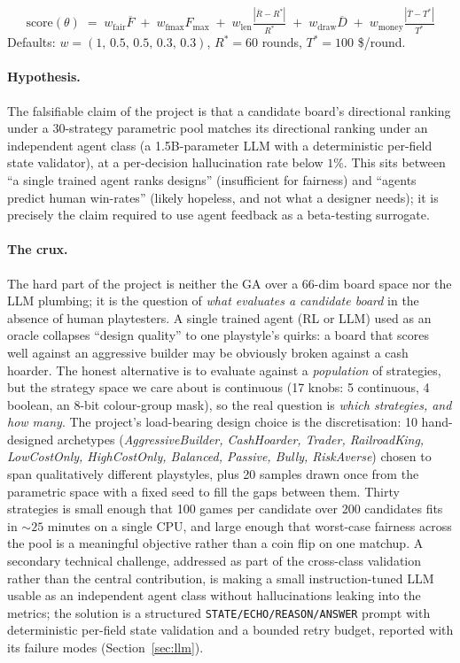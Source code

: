 \documentclass[10pt]{article}
\begin{document}
\begin{equation}\label{eq:score}
\text{score}(\theta) \;=\;
   w_{\text{fair}} \overline{F} \;+\;
   w_{\text{fmax}} F_{\max} \;+\;
   w_{\text{len}}  \tfrac{|\overline{R}-R^{*}|}{R^{*}} \;+\;
   w_{\text{draw}}\overline{D} \;+\;
   w_{\text{money}}\tfrac{|\overline{T}-T^{*}|}{T^{*}}
\end{equation}
Defaults: $w=(1,\,0.5,\,0.5,\,0.3,\,0.3)$, $R^{*}=60$ rounds,
$T^{*}=100$ \$/round.

\paragraph{Hypothesis.} The falsifiable claim of the project is that a
candidate board's directional ranking under a 30-strategy parametric
pool matches its directional ranking under an independent agent class
(a 1.5B-parameter LLM with a deterministic per-field state validator),
at a per-decision hallucination rate below $1\%$. This sits between
``a single trained agent ranks designs'' (insufficient for fairness)
and ``agents predict human win-rates'' (likely hopeless, and not what a
designer needs); it is precisely the claim required to use agent
feedback as a beta-testing surrogate.

\paragraph{The crux.} The hard part of the project is neither the GA
over a 66-dim board space nor the LLM plumbing; it is the question of
\emph{what evaluates a candidate board} in the absence of human
playtesters. A single trained agent (RL or LLM) used as an oracle
collapses ``design quality'' to one playstyle's quirks: a board that
scores well against an aggressive builder may be obviously broken
against a cash hoarder. The honest alternative is to evaluate against a
\emph{population} of strategies, but the strategy space we care about
is continuous (17 knobs: 5 continuous, 4 boolean, an 8-bit
colour-group mask), so the real question is \emph{which strategies,
and how many}. The project's load-bearing design choice is the
discretisation: 10 hand-designed archetypes (\textsl{AggressiveBuilder,
CashHoarder, Trader, RailroadKing, LowCostOnly, HighCostOnly, Balanced,
Passive, Bully, RiskAverse}) chosen to span qualitatively different
playstyles, plus 20 samples drawn once from the parametric space with
a fixed seed to fill the gaps between them. Thirty strategies is small
enough that 100 games per candidate over 200 candidates fits in
$\sim 25$ minutes on a single CPU, and large enough that worst-case
fairness across the pool is a meaningful objective rather than a coin
flip on one matchup. A secondary technical challenge, addressed as part
of the cross-class validation rather than the central contribution, is
making a small instruction-tuned LLM usable as an independent agent
class without hallucinations leaking into the metrics; the solution is
a structured \texttt{STATE/ECHO/REASON/ANSWER} prompt with
deterministic per-field state validation and a bounded retry budget,
reported with its failure modes (Section~\ref{sec:llm}).
\end{document}
